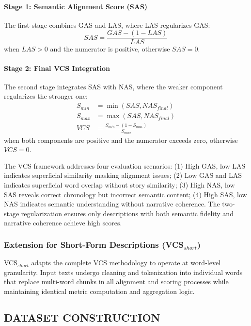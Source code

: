 \documentclass[main.tex]{subfiles}
\begin{document}
\paragraph{Stage 1: Semantic Alignment Score (SAS)}
The first stage combines GAS and LAS, where LAS regularizes GAS:
\begin{equation} \label{eq:sas_revised} 
SAS = \frac{GAS - (1 - LAS)}{LAS}
\end{equation}
when $LAS > 0$ and the numerator is positive, otherwise $SAS = 0$.

\paragraph{Stage 2: Final VCS Integration}
The second stage integrates SAS with NAS, where the weaker component regularizes the stronger one:
\begin{align}
S_{min} &= \min(SAS, NAS_{final}) \label{eq:s_min} \\
S_{max} &= \max(SAS, NAS_{final}) \label{eq:s_max} \\
VCS &= \frac{S_{min} - (1 - S_{max})}{S_{max}} \label{eq:vcs_final}
\end{align}
when both components are positive and the numerator exceeds zero, otherwise $VCS = 0$.

The VCS framework addresses four evaluation scenarios: (1) High GAS, low LAS indicates superficial similarity masking alignment issues; (2) Low GAS and LAS indicates superficial word overlap without story similarity; (3) High NAS, low SAS reveals correct chronology but incorrect semantic content; (4) High SAS, low NAS indicates semantic understanding without narrative coherence. The two-stage regularization ensures only descriptions with both semantic fidelity and narrative coherence achieve high scores.

\subsubsection{Extension for Short-Form Descriptions (VCS$_{short}$)}
VCS$_{short}$ adapts the complete VCS methodology to operate at word-level granularity. Input texts undergo cleaning and tokenization into individual words that replace multi-word chunks in all alignment and scoring processes while maintaining identical metric computation and aggregation logic.

\subsection{DATASET CONSTRUCTION}
\end{document}
